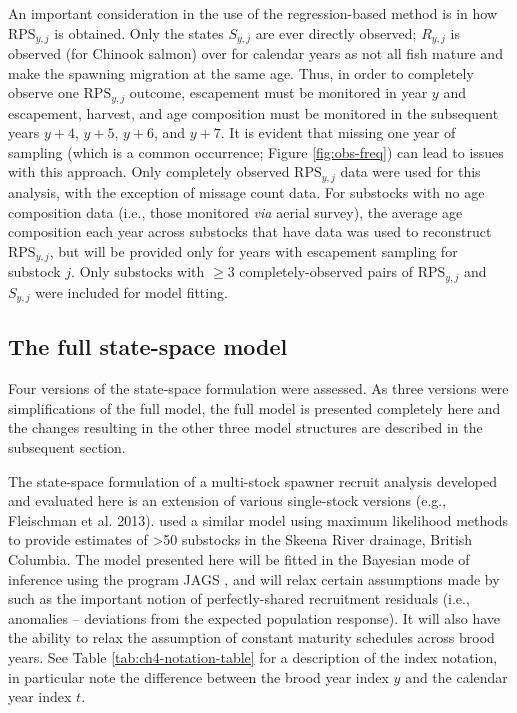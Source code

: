 \documentclass[12pt,]{book}
\theoremstyle{definition}
\theoremstyle{definition}
\theoremstyle{definition}
\theoremstyle{remark}
\begin{document}
\noindent
An important consideration in the use of the regression-based method is
in how \(\text{RPS}_{y,j}\) is obtained. Only the states \(S_{y,j}\) are
ever directly observed; \(R_{y,j}\) is observed (for Chinook salmon)
over for calendar years as not all fish mature and make the spawning
migration at the same age. Thus, in order to completely observe one
\(\text{RPS}_{y,j}\) outcome, escapement must be monitored in year \(y\)
and escapement, harvest, and age composition must be monitored in the
subsequent years \(y+4\), \(y+5\), \(y+6\), and \(y+7\). It is evident
that missing one year of sampling (which is a common occurrence; Figure
\ref{fig:obs-freq}) can lead to issues with this approach. Only
completely observed \(\text{RPS}_{y,j}\) data were used for this
analysis, with the exception of missage count data. For substocks with
no age composition data (i.e., those monitored \emph{via} aerial
survey), the average age composition each year across substocks that
have data was used to reconstruct \(\text{RPS}_{y,j}\), but will be
provided only for years with escapement sampling for substock \(j\).
Only substocks with \(\ge3\) completely-observed pairs of
\(\text{RPS}_{y,j}\) and \(S_{y,j}\) were included for model fitting.

\subsection{The full state-space model}\label{ssm-model}

\noindent
Four versions of the state-space formulation were assessed. As three
versions were simplifications of the full model, the full model is
presented completely here and the changes resulting in the other three
model structures are described in the subsequent section.

The state-space formulation of a multi-stock spawner recruit analysis
developed and evaluated here is an extension of various single-stock
versions (e.g., Fleischman et al. 2013). \citet{walters-etal-2008} used
a similar model using maximum likelihood methods to provide estimates of
\textgreater{}50 substocks in the Skeena River drainage, British
Columbia. The model presented here will be fitted in the Bayesian mode
of inference using the program JAGS \citep{plummer-2017}, and will relax
certain assumptions made by \citet{walters-etal-2008} such as the
important notion of perfectly-shared recruitment residuals (i.e.,
anomalies -- deviations from the expected population response). It will
also have the ability to relax the assumption of constant maturity
schedules across brood years. See Table \ref{tab:ch4-notation-table} for
a description of the index notation, in particular note the difference
between the brood year index \(y\) and the calendar year index \(t\).
\end{document}
